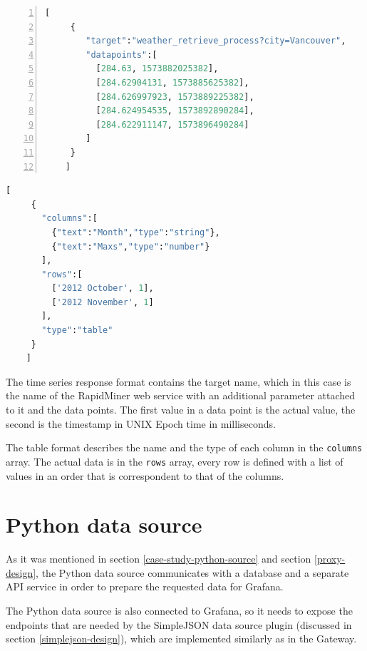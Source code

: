 \begin{minipage}[b]{0.45\linewidth}
	\centering
	\begin{lstlisting}[language=Python, frame=single, numbers=left, mathescape,%
	caption={Time series format}, label=lst:timeseries-format]
	[
	 {
	    "target":"weather_retrieve_process?city=Vancouver",
	    "datapoints":[
	      [284.63, 1573882025382],
	      [284.62904131, 1573885625382],
	      [284.626997923, 1573889225382],
	      [284.624954535, 1573892890284],
	      [284.622911147, 1573896490284]
	    ]
	 }
	]
	\end{lstlisting}
\end{minipage}
\hspace{0.5cm}
\begin{minipage}[b]{0.45\linewidth}
	\centering
	\begin{lstlisting}[language=Python, frame=single, mathescape,%
	caption={Table format}, label=lst:table-format]
	[
	 {
	   "columns":[
	     {"text":"Month","type":"string"},
	     {"text":"Maxs","type":"number"}
	   ],
	   "rows":[
	     ['2012 October', 1],
	     ['2012 November', 1]
	   ],
	   "type":"table"
	 }
	]
	\end{lstlisting}
\end{minipage}

The time series response format contains the target name, which in this case is the name of the RapidMiner web service with an additional parameter attached to it and the data points. The first value in a data point is the actual value, the second is the timestamp in UNIX Epoch time in milliseconds.

The table format describes the name and the type of each column in the \texttt{columns} array. The actual data is in the \texttt{rows} array, every row is defined with a list of values in an order that is correspondent to that of the columns.

\section{Python data source}

As it was mentioned in section \ref{case-study-python-source} and section \ref{proxy-design}, the Python data source communicates with a database and a separate API service in order to prepare the requested data for Grafana.

The Python data source is also connected to Grafana, so it needs to expose the endpoints that are needed by the SimpleJSON data source plugin (discussed in section \ref{simplejson-design}), which are implemented similarly as in the Gateway.

